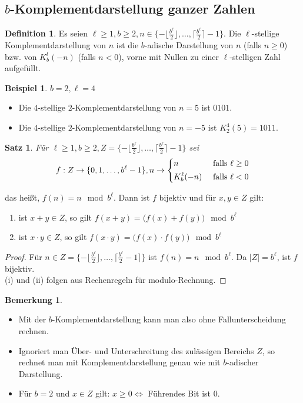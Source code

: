 \documentclass[a4paper,12pt]{article}
\newtheorem{satz}[axiom]{Satz}
\theoremstyle{definition}
\newtheorem*{example}{Beispiel}
\newtheorem*{bemerkung}{Bemerkung}
\newtheorem{definition}[axiom]{Definition}
\begin{document}
	\subsection{$b$-Komplementdarstellung ganzer Zahlen}
	\begin{definition}
		Es seien $\ell \geq 1, b \geq 2, n \in \{- \lfloor \frac{b^\ell}{2} \rfloor, \ldots, \lceil \frac{b^\ell}{2}\rceil - 1\}$. Die $\ell$-stellige Komplementdarstellung von $n$ ist die $b$-adische Darstellung von $n$ (falls $n\geq 0$) bzw. von $K_b^l(-n)$ (falls $n < 0$), vorne mit Nullen zu einer $\ell$-stelligen Zahl aufgefüllt.
	\end{definition}
	\begin{example}
		$b = 2, \ell = 4$
		\begin{itemize}
			\item Die $4$-stellige $2$-Komplementdarstellung von $n = 5$ ist $0101$.
			\item Die $4$-stellige $2$-Komplementdarstellung von $n = -5$ ist $K_2^4(5) = 1011$.
		\end{itemize}
	\end{example}
	\begin{satz}
		Für $\ell \geq 1, b \geq 2, Z = \{-\lfloor \frac{b^\ell}{2} \rfloor, \ldots, \lceil \frac{b^\ell}{2}\rceil - 1\}$ sei
		\[
			f: Z \to \{0,1,\ldots, b^\ell - 1\}, n \to \begin{dcases}
				n &\text{ falls } \ell \geq 0\\
				K_b^\ell(-n)&\text{ falls } \ell < 0
			\end{dcases}
		\]
	\end{satz}
	das heißt, $f(n) = n \mod b^\ell$. Dann ist $f$ bijektiv und für $x,y \in Z$ gilt:
	\begin{enumerate}[label=(\roman*)]
		\item ist $x + y \in Z$, so gilt $f(x + y) = \big(f(x) + f(y)\big) \mod b^\ell$
		\item ist $x \cdot y \in Z$, so gilt $f(x \cdot y) = \big(f(x) \cdot f(y)\big) \mod b^\ell$
	\end{enumerate}
	\begin{proof}
		Für $n \in Z = \{-\lfloor \frac{b^\ell}{2}\rfloor, \ldots, \lceil \frac{b^\ell}{2} - 1\rceil\}$ ist $f(n) = n \mod b^\ell$. Da $\lvert Z \rvert = b^\ell$, ist $f$ bijektiv.\\[2ex]
		(i) und (ii) folgen aus Rechenregeln für modulo-Rechnung.
	\end{proof}
	\begin{bemerkung}
		\begin{itemize}
			\item Mit der $b$-Komplementdarstellung kann man also ohne Fallunterscheidung rechnen.
			\item Ignoriert man Über- und Unterschreitung des zulässigen Bereichs $Z$, so rechnet man mit Komplementdarstellung genau wie mit $b$-adischer Darstellung.
			\item Für $b = 2$ und $x \in Z$ gilt: $x \geq 0 \Longleftrightarrow$ Führendes Bit ist $0$.
		\end{itemize}
	\end{bemerkung}
\end{document}
